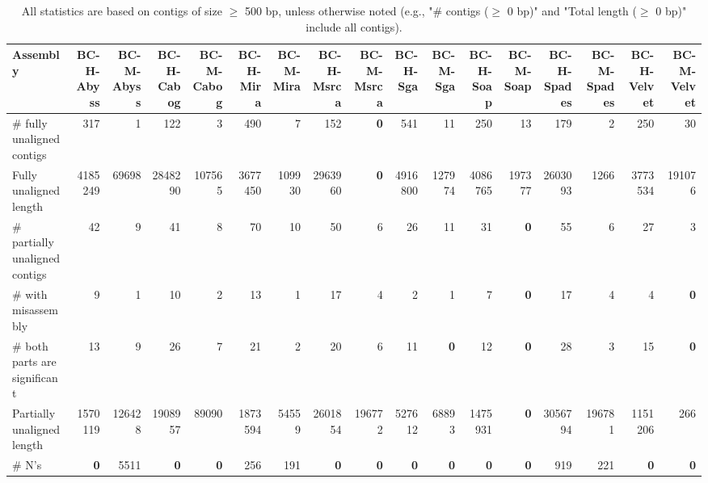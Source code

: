 \documentclass[12pt,a4paper]{article}
\begin{document}
\begin{table}[ht]
\begin{center}
\caption{All statistics are based on contigs of size $\geq$ 500 bp, unless otherwise noted (e.g., "\# contigs ($\geq$ 0 bp)" and "Total length ($\geq$ 0 bp)" include all contigs).}
\begin{tabular}{|l*{16}{|r}|}
\hline
Assembly & BC-H-Abyss & BC-M-Abyss & BC-H-Cabog & BC-M-Cabog & BC-H-Mira & BC-M-Mira & BC-H-Msrca & BC-M-Msrca & BC-H-Sga & BC-M-Sga & BC-H-Soap & BC-M-Soap & BC-H-Spades & BC-M-Spades & BC-H-Velvet & BC-M-Velvet \\ \hline
\# fully unaligned contigs & 317 & 1 & 122 & 3 & 490 & 7 & 152 & {\bf 0} & 541 & 11 & 250 & 13 & 179 & 2 & 250 & 30 \\ \hline
Fully unaligned length & 4185249 & 69698 & 2848290 & 107565 & 3677450 & 109930 & 2963960 & {\bf 0} & 4916800 & 127974 & 4086765 & 197377 & 2603093 & 1266 & 3773534 & 191076 \\ \hline
\# partially unaligned contigs & 42 & 9 & 41 & 8 & 70 & 10 & 50 & 6 & 26 & 11 & 31 & {\bf 0} & 55 & 6 & 27 & 3 \\ \hline
\hspace{5mm}\# with misassembly & 9 & 1 & 10 & 2 & 13 & 1 & 17 & 4 & 2 & 1 & 7 & {\bf 0} & 17 & 4 & 4 & {\bf 0} \\ \hline
\hspace{5mm}\# both parts are significant & 13 & 9 & 26 & 7 & 21 & 2 & 20 & 6 & 11 & {\bf 0} & 12 & {\bf 0} & 28 & 3 & 15 & {\bf 0} \\ \hline
Partially unaligned length & 1570119 & 126428 & 1908957 & 89090 & 1873594 & 54559 & 2601854 & 196772 & 527612 & 68893 & 1475931 & {\bf 0} & 3056794 & 196781 & 1151206 & 266 \\ \hline
\# N's & {\bf 0} & 5511 & {\bf 0} & {\bf 0} & 256 & 191 & {\bf 0} & {\bf 0} & {\bf 0} & {\bf 0} & {\bf 0} & {\bf 0} & 919 & 221 & {\bf 0} & {\bf 0} \\ \hline
\end{tabular}
\end{center}
\end{table}
\end{document}
